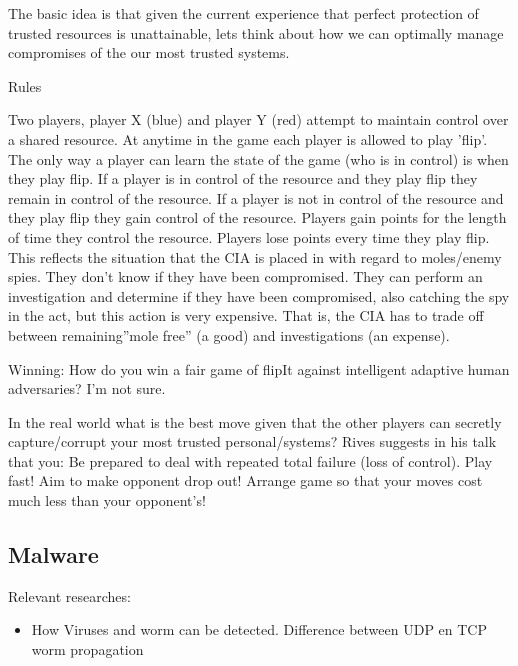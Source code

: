 The basic idea is that given the current experience that perfect protection of trusted resources is unattainable, lets think about how we can optimally manage compromises of the our most trusted systems.

Rules

Two players, player X (blue) and player Y (red) attempt to maintain control over a shared resource.
At anytime in the game each player is allowed to play 'flip'.
The only way a player can learn the state of the game (who is in control) is when they play flip.
If a player is in control of the resource and they play flip they remain in control of the resource.
If a player is not in control of the resource and they play flip they gain control of the resource.
Players gain points for the length of time they control the resource.
Players lose points every time they play flip.
This reflects the situation that the CIA is placed in with regard to moles/enemy spies. They don't know if they have been compromised. They can perform an investigation and determine if they have been compromised, also catching the spy in the act, but this action is very expensive. That is, the CIA has to trade off between remaining''mole free'' (a good) and investigations (an expense).

Winning: How do you win a fair game of flipIt against intelligent adaptive human adversaries? I'm not sure.

In the real world what is the best move given that the other players can secretly capture/corrupt your most trusted personal/systems? Rives suggests in his talk that you:
Be prepared to deal with repeated total failure (loss of control).
Play fast! Aim to make opponent drop out!
Arrange game so that your moves cost much less than your opponent's!



\subsection{Malware}
Relevant researches:
\begin{itemize}
\item How Viruses and worm can be detected. Difference between UDP en TCP worm propagation
\end{itemize}




